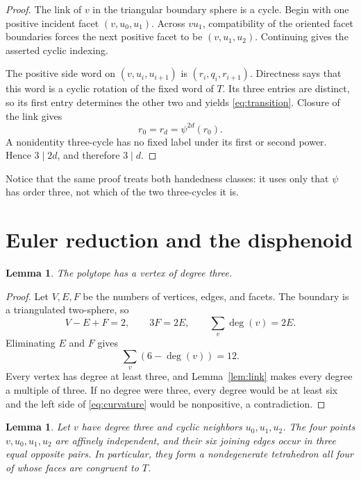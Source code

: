 \documentclass[11pt]{article}
\newtheorem{lemma}[theorem]{Lemma}
\begin{document}
\begin{proof}
The link of $v$ in the triangular boundary sphere is a cycle.  Begin with
one positive incident facet $(v,u_0,u_1)$.  Across $vu_1$, compatibility of
the oriented facet boundaries forces the next positive facet to be
$(v,u_1,u_2)$.  Continuing gives the asserted cyclic indexing.

The positive side word on $(v,u_i,u_{i+1})$ is
$(r_i,q_i,r_{i+1})$.  Directness says that this word is a cyclic rotation of
the fixed word of $T$.  Its three entries are distinct, so its first entry
determines the other two and yields \eqref{eq:transition}.  Closure of the
link gives
\[
 r_0=r_d=\psi^{2d}(r_0).
\]
A nonidentity three-cycle has no fixed label under its first or second power.
Hence $3\mid 2d$, and therefore $3\mid d$.
\end{proof}

Notice that the same proof treats both handedness classes: it uses only that
$\psi$ has order three, not which of the two three-cycles it is.

\section{Euler reduction and the disphenoid}

\begin{lemma}\label{lem:degree3}
The polytope has a vertex of degree three.
\end{lemma}

\begin{proof}
Let $V,E,F$ be the numbers of vertices, edges, and facets.  The boundary is a
triangulated two-sphere, so
\[
 V-E+F=2,\qquad 3F=2E,\qquad
 \sum_v\deg(v)=2E.
\]
Eliminating $E$ and $F$ gives
\begin{equation}\label{eq:curvature}
 \sum_v(6-\deg(v))=12.
\end{equation}
Every vertex has degree at least three, and Lemma~\ref{lem:link} makes every
degree a multiple of three.  If no degree were three, every degree would be
at least six and the left side of \eqref{eq:curvature} would be nonpositive,
a contradiction.
\end{proof}

\begin{lemma}\label{lem:star}
Let $v$ have degree three and cyclic neighbors $u_0,u_1,u_2$.  The four
points $v,u_0,u_1,u_2$ are affinely independent, and their six joining edges
occur in three equal opposite pairs.  In particular, they form a
nondegenerate tetrahedron all four of whose faces are congruent to $T$.
\end{lemma}
\end{document}
